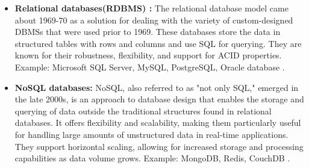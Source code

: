 \begin{itemize}
    \item \textbf{Relational databases(RDBMS) :} The relational database model came about 1969-70 as a solution for dealing with the variety of custom-designed DBMSs that were used prior to 1969. These databases store the data in structured tables with rows and columns and use SQL for querying. They are known for their robustness, flexibility, and support for ACID properties. Example: Microsoft SQL Server, MySQL, PostgreSQL, Oracle database \cite{editor-2024,foote-2023}.
    
    \item \textbf{NoSQL databases:} NoSQL, also referred to as "not only SQL," emerged in the late 2000s, is an approach to database design that enables the storage and querying of data outside the traditional structures found in relational databases. It offers flexibility and scalability, making them particularly useful for handling large amounts of unstructured data in real-time applications. They support horizontal scaling, allowing for increased storage and processing capabilities as data volume grows. Example: MongoDB, Redis, CouchDB \cite{ibm-2024,justacademy_nosql_characteristics}.
\end{itemize}

